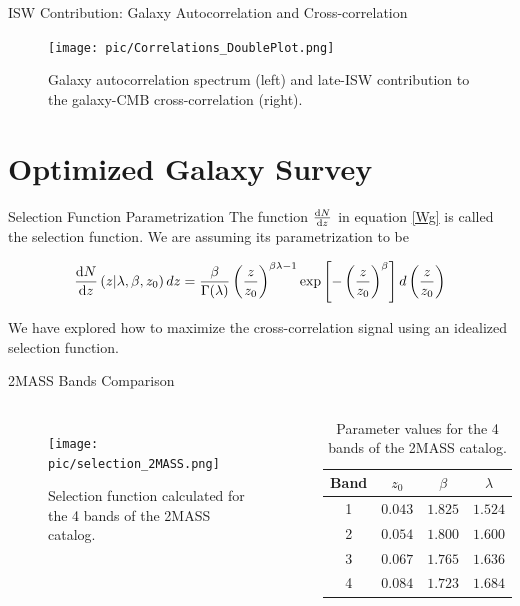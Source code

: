 \documentclass[serif, aspectratio=169]{beamer}
\begin{document}
\begin{frame}{ISW Contribution: Galaxy Autocorrelation and Cross-correlation}
    \begin{figure}
        \centering
        \texttt{[image: pic/Correlations\_DoublePlot.png]}
        \caption{Galaxy autocorrelation spectrum (left) and late-ISW contribution to the galaxy-CMB
cross-correlation (right).}
        \label{fig:ISWplots_Cgg_and_Ctg}
    \end{figure}
\end{frame}

\section{Optimized Galaxy Survey}

\begin{frame}{Selection Function Parametrization}
    The function $\dv{N}{z}$ in equation \eqref{Wg} is called the selection function. We are assuming its parametrization to be

    \begin{equation}\label{select_func_par}
        \dv{N}{z}\left(z|\lambda, \beta, z_0\right)dz=\frac{\beta}{\Gamma(\lambda)}\left(\frac{z}{z_0}\right)^{\beta\lambda-1}\text{exp}\left[-\left(\frac{z}{z_0}\right)^\beta\right]d\left(\frac{z}{z_0}\right)
    \end{equation}

    We have explored how to maximize the cross-correlation signal using an idealized selection function.
\end{frame}

\begin{frame}{2MASS Bands Comparison}
    \begin{columns}
        \begin{figure}
            \centering
            \texttt{[image: pic/selection\_2MASS.png]}
            \caption{Selection function calculated for the 4 bands of the 2MASS catalog.}
            \label{fig:selection_2MASS}
        \end{figure}
    
        \begin{table}[!htb]
            \centering
            \begin{tabular}{cccc} \hline
             Band & $z_0$ & $\beta$ & $\lambda$ \\ \hline
             1 & $0.043$ & $1.825$ & $1.524$\\
             2 & $0.054$ & $1.800$ & $1.600$ \\
             3 & $0.067$ & $1.765$ & $1.636$\\
             4 & $0.084$ & $1.723$ & $1.684$\\ \hline
            \end{tabular}
            \caption{Parameter values for the 4 bands of the 2MASS catalog.}
            \label{tab:bands_2MASS}
        \end{table}
    \end{columns}
\end{frame}
\end{document}
